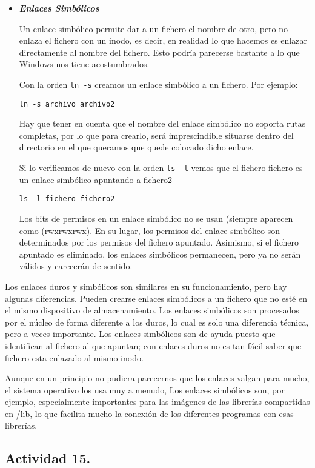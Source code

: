 \documentclass[a4paper,11pt,spanish]{article} %
\begin{document}
\begin{itemize}
\item \textbf{\emph{Enlaces Simbólicos}}

Un enlace simbólico permite dar a un fichero el nombre de otro, pero no enlaza el fichero con un inodo,
es decir, en realidad lo que hacemos es enlazar directamente al nombre del fichero. 
Esto podría parecerse bastante a lo que Windows nos tiene acostumbrados.

Con la orden \texttt{ln -s} creamos un enlace simbólico a un fichero. Por ejemplo:

\texttt{ln -s archivo archivo2}

Hay que tener en cuenta que el nombre del enlace simbólico no soporta rutas completas, 
por lo que para crearlo, será imprescindible situarse dentro del directorio en el que queramos
que quede colocado dicho enlace.

Si lo verificamos de nuevo con la orden \texttt{ls -l} vemos que el fichero fichero es 
un enlace simbólico apuntando a fichero2

\texttt{ls -l fichero fichero2}

Los bits de permisos en un enlace simbólico no se usan (siempre aparecen como (rwxrwxrwx).
En su lugar, los permisos del enlace simbólico son determinados por los permisos del fichero apuntado. 
Asimismo, si el fichero apuntado es eliminado, los enlaces simbólicos permanecen, pero ya no 
serán válidos y carecerán de sentido.
\end{itemize}

Los enlaces duros y simbólicos son similares en su funcionamiento, pero hay algunas diferencias. 
Pueden crearse enlaces simbólicos a un fichero que no esté en el mismo dispositivo de almacenamiento.
Los enlaces simbólicos son procesados por el núcleo de forma diferente a los duros, lo cual es solo
una diferencia técnica, pero a veces importante. Los enlaces simbólicos son de ayuda puesto que
identifican al fichero al que apuntan; con enlaces duros no es tan fácil saber que fichero esta
enlazado al mismo inodo.

Aunque en un principio no pudiera parecernos que los enlaces valgan para mucho, el sistema
operativo los usa muy a menudo, Los enlaces simbólicos son, por ejemplo, especialmente
importantes para las imágenes de las librerías compartidas en /lib, lo que facilita mucho la
conexión de los diferentes programas con esas librerías.

\cite{utlai}


\subsection{Actividad 15.}
\end{document}
